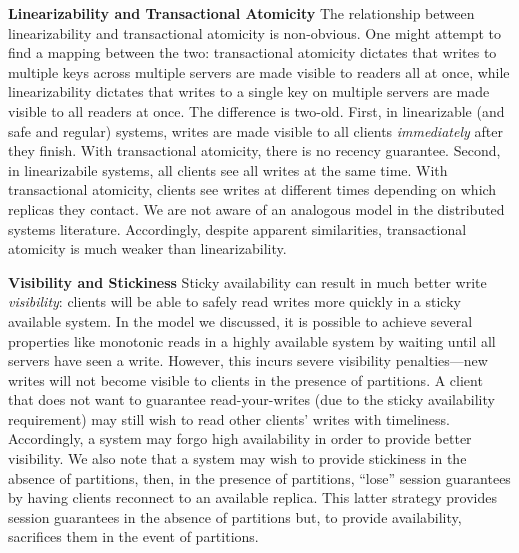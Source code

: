 \vspace{.5em}\noindent\textbf{Linearizability and Transactional
  Atomicity} The relationship between linearizability and
transactional atomicity is non-obvious. One might attempt to find a
mapping between the two: transactional atomicity dictates that writes
to multiple keys across multiple servers are made visible to readers
all at once, while linearizability dictates that writes to a single
key on multiple servers are made visible to all readers at once. The
difference is two-old. First, in linearizable (and safe and regular)
systems, writes are made visible to all clients \textit{immediately}
after they finish. With transactional atomicity, there is no recency
guarantee. Second, in linearizabile systems, all clients see all
writes at the same time. With transactional atomicity, clients see
writes at different times depending on which replicas they contact. We
are not aware of an analogous model in the distributed systems
literature. Accordingly, despite apparent similarities, transactional
atomicity is much weaker than linearizability.

\vspace{.5em}\noindent\textbf{Visibility and Stickiness} Sticky
availability can result in much better write \textit{visibility}:
clients will be able to safely read writes more quickly in a sticky
available system. In the model we discussed, it is possible to achieve
several properties like monotonic reads in a highly available system
by waiting until all servers have seen a write. However, this incurs
severe visibility penalties---new writes will not become visible to
clients in the presence of partitions. A client that does not want to
guarantee read-your-writes (due to the sticky availability
requirement) may still wish to read other clients' writes with
timeliness. Accordingly, a system may forgo high availability in order
to provide better visibility. We also note that a system may wish to
provide stickiness in the absence of partitions, then, in the presence
of partitions, ``lose'' session guarantees by having clients reconnect
to an available replica. This latter strategy provides session
guarantees in the absence of partitions but, to provide availability,
sacrifices them in the event of partitions.

